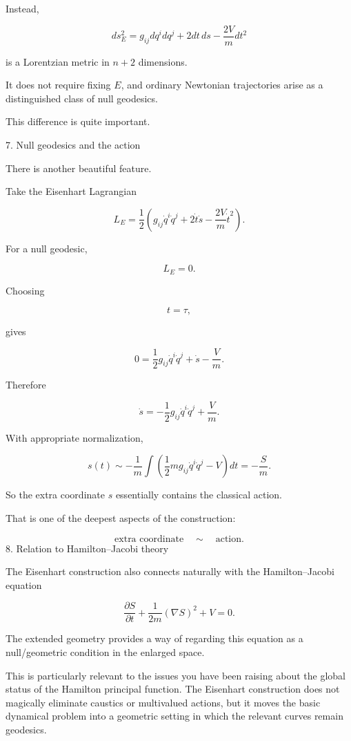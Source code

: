 Instead,

$$ ds_E^2 = g_{ij}dq^i dq^j +2dt\,ds -\frac{2V}{m}dt^2 $$

is a Lorentzian metric in \(n+2\) dimensions.

It does not require fixing \(E\), and ordinary Newtonian trajectories arise as a distinguished class of null geodesics.

This difference is quite important.

7. Null geodesics and the action

There is another beautiful feature.

Take the Eisenhart Lagrangian

$$ L_E = \frac12 \left( g_{ij}\dot q^i\dot q^j +2\dot t\dot s -\frac{2V}{m}\dot t^2 \right). $$

For a null geodesic,

$$ L_E=0. $$

Choosing

$$ t=\tau, $$

gives

$$ 0= \frac12g_{ij}\dot q^i\dot q^j +\dot s -\frac{V}{m}. $$

Therefore

$$ \dot s = -\frac12g_{ij}\dot q^i\dot q^j +\frac{V}{m}. $$

With appropriate normalization,

$$ s(t) \sim -\frac{1}{m}\int \left( \frac12m g_{ij}\dot q^i\dot q^j-V \right)dt = -\frac{S}{m}. $$

So the extra coordinate \(s\) essentially contains the classical action.

That is one of the deepest aspects of the construction:

$$ \boxed{ \text{extra coordinate} \quad\sim\quad \text{action}. } $$
8. Relation to Hamilton–Jacobi theory

The Eisenhart construction also connects naturally with the Hamilton–Jacobi equation

$$ \frac{\partial S}{\partial t} + \frac{1}{2m}(\nabla S)^2 + V=0. $$

The extended geometry provides a way of regarding this equation as a null/geometric condition in the enlarged space.

This is particularly relevant to the issues you have been raising about the global status of the Hamilton principal function. The Eisenhart construction does not magically eliminate caustics or multivalued actions, but it moves the basic dynamical problem into a geometric setting in which the relevant curves remain geodesics.

